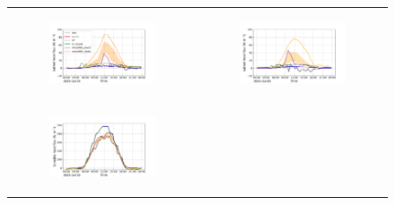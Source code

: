 \begin{figure}[hbtp]
    \centering
    \begin{tabular}{cc}
        \begin{subfigure}[t]{0.5\textwidth}
            \caption{}
            \includegraphics[width=\textwidth]{images/chap6/IOP_TS/TS_2021-07-15_elsplans_flat.png}
        \end{subfigure} &
        \begin{subfigure}[t]{0.5\textwidth}
            \caption{}
            \includegraphics[width=\textwidth]{images/chap6/IOP_TS/TS_2021-07-20_elsplans_flat.png}
        \end{subfigure} \\
        \begin{subfigure}[t]{0.5\textwidth}
            \caption{}
            \includegraphics[width=\textwidth]{images/chap6/IOP_TS/TS_2021-07-15_elsplans_sens.png}

\end{subfigure}
\end{tabular}
\end{figure}

